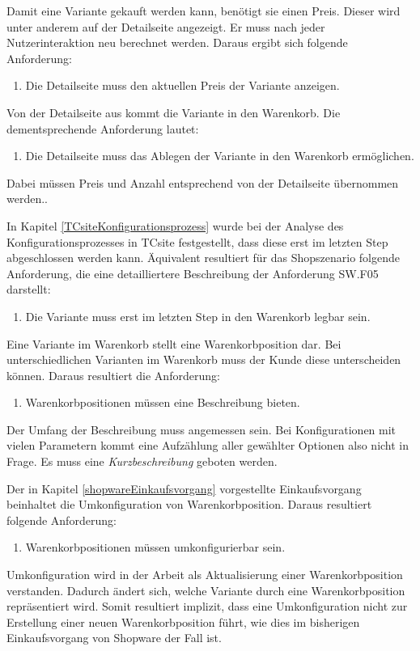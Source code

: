 \documentclass[11pt, a4paper, titlepage, listof=totoc, bibliography=totoc, index=totoc, twoside, openright, headings=normal]{scrreprt}
\begin{document}
Damit eine Variante gekauft werden kann, benötigt sie einen Preis. Dieser wird unter anderem auf der Detailseite angezeigt. Er muss nach jeder Nutzerinteraktion neu berechnet werden. Daraus ergibt sich folgende Anforderung:
\begin{enumerate}[SW.F04:]\bfseries
\item Die Detailseite muss den aktuellen Preis der Variante anzeigen.
\end{enumerate}
Von der Detailseite aus kommt die Variante in den Warenkorb. Die dementsprechende Anforderung lautet:
\begin{enumerate}[SW.F05:]\bfseries
\item Die Detailseite muss das Ablegen der Variante in den Warenkorb ermöglichen.
\end{enumerate}
Dabei müssen Preis und Anzahl entsprechend von der Detailseite übernommen werden..

In Kapitel \ref{TCsiteKonfigurationsprozess} wurde bei der Analyse des Konfigurationsprozesses in TCsite festgestellt, dass diese erst im letzten Step abgeschlossen werden kann. Äquivalent resultiert für das Shopszenario folgende Anforderung, die eine detailliertere Beschreibung der Anforderung SW.F05 darstellt:
\begin{enumerate}[SW.F06:]\bfseries
\item Die Variante muss erst im letzten Step in den Warenkorb legbar sein.
\end{enumerate}
Eine Variante im Warenkorb stellt eine Warenkorbposition dar. Bei unterschiedlichen Varianten im Warenkorb muss der Kunde diese unterscheiden können. Daraus resultiert die Anforderung:
\begin{enumerate}[SW.F07:]\bfseries
\item Warenkorbpositionen müssen eine Beschreibung bieten.
\end{enumerate}
Der Umfang der Beschreibung muss angemessen sein. Bei Konfigurationen mit vielen Parametern kommt eine Aufzählung aller gewählter Optionen also nicht in Frage. Es muss eine \emph{Kurzbeschreibung} geboten werden.

Der in Kapitel \ref{shopwareEinkaufsvorgang} vorgestellte Einkaufsvorgang beinhaltet die Umkonfiguration von Warenkorbposition. Daraus resultiert folgende Anforderung: 
\begin{enumerate}[SW.F08:]\bfseries
\item Warenkorbpositionen müssen umkonfigurierbar sein.
\end{enumerate}
Umkonfiguration wird in der Arbeit als Aktualisierung einer Warenkorbposition verstanden. Dadurch ändert sich, welche Variante durch eine Warenkorbposition repräsentiert wird. Somit resultiert implizit, dass eine Umkonfiguration nicht zur Erstellung einer neuen Warenkorbposition führt, wie dies im bisherigen Einkaufsvorgang von Shopware der Fall ist.
\end{document}
